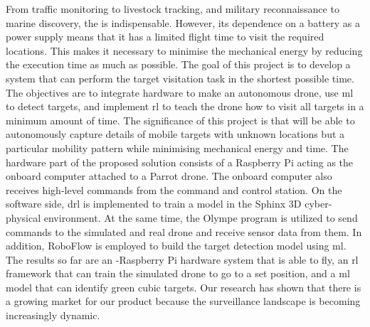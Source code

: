 \documentclass[../main.tex]{subfiles}
\begin{document}
From traffic monitoring to livestock tracking, and 
military reconnaissance to marine discovery, the \uav
is indispensable.
However, its dependence on a battery as a power supply means
that it has a limited flight time to visit the required
locations. This makes it necessary to minimise 
the mechanical energy by reducing the execution time as much
as possible.
The goal of this project is to develop a system 
that can perform the target visitation task in the shortest
possible time. The objectives are to integrate hardware to make
an autonomous drone, use \gls{ml} 
to detect targets,
and implement \gls{rl} to 
teach the drone how to visit all targets in a minimum amount of time.
The significance of this project is that \uavs will be
able to autonomously capture details of mobile targets with
unknown locations but a particular mobility pattern
while minimising mechanical energy and time.
The hardware part of the proposed solution 
consists of a Raspberry Pi acting as the onboard computer
attached to a Parrot \anafi drone. The onboard computer
also receives high-level commands from the command and control
station. On the software side, \gls{drl} is 
implemented to train a model in the Sphinx 3D
cyber-physical environment. At the same time,
the Olympe program is utilized
to send commands to the simulated and real \anafi drone
and receive sensor data from them. 
In addition, RoboFlow is employed
to build the target detection model using \gls{ml}.
The results so far are an \anafi-Raspberry Pi hardware system
that is able to fly, an \gls{rl} framework that can train the
simulated drone to go to a set position, and a \gls{ml}
model that can identify green cubic targets.
Our research has shown that there is a growing market for
our product because the surveillance landscape
is becoming increasingly dynamic.
\end{document}
